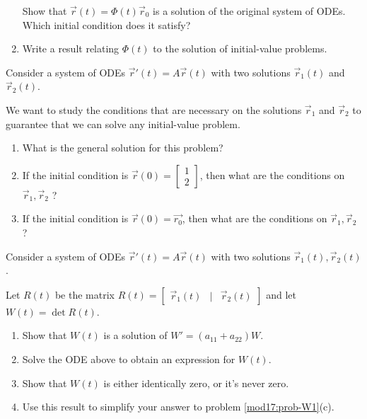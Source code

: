 \begin{exercises}
\begin{problist}
\begin{enumerate}
			Show that $\vec{r}(t) = \Phi(t) \vec{r}_0$ is a solution of the original system of ODEs. Which initial condition does it satisfy?
			
			\item Write a result relating $\Phi(t)$ to the solution of initial-value problems.
			\end{enumerate}

	
	
		\prob \label{mod17:prob-W1}Consider a system of ODEs $\vec{r}'(t) = A \vec{r}(t)$ with two solutions $\vec{r}_1(t)$ and $\vec{r}_2(t)$. 
		
		We want to study the conditions that are necessary on the solutions $\vec{r}_1$ and $\vec{r}_2$ to guarantee that we can solve any initial-value problem.
		
		\begin{enumerate}
			\item What is the general solution for this problem?
			\item If the initial condition is $\vec{r}(0)= \begin{bmatrix} 1 \\ 2 \end{bmatrix}$, then what are the conditions on $\vec{r}_1,\vec{r}_2$ ?
			\item If the initial condition is $\vec{r}(0)= \vec{r_0}$, then what are the conditions on $\vec{r}_1,\vec{r}_2$ ?
		\end{enumerate}

		\prob Consider a system of ODEs $\vec{r}'(t) = A \vec{r}(t)$ with two solutions $\vec{r}_1(t), \vec{r}_2(t)$.
		
			Let $R(t)$ be the matrix 
				$R(t) = \begin{bmatrix} \vec{r}_1(t) & | & \vec{r}_2(t)	\end{bmatrix} $ 
				and let $W(t) = \det R(t)$.
		
		\begin{enumerate}
			\item Show that $W(t)$ is a solution of $W' = (a_{11} + a_{22}) W$.
			\item Solve the ODE above to obtain an expression for $W(t)$.
			\item Show that $W(t)$ is either identically zero, or it's never zero. 
			\item Use this result to simplify your answer to problem \ref{mod17:prob-W1}(c).
		\end{enumerate}
	
	\end{problist}
\end{exercises}
